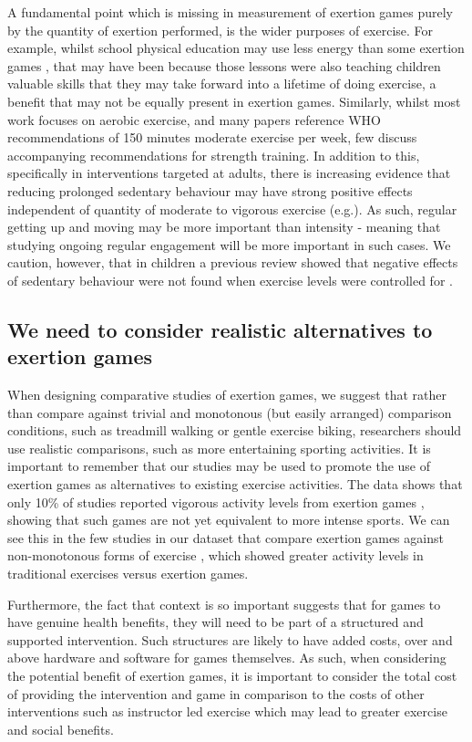 A fundamental point which is missing in measurement of exertion games purely by the quantity of exertion performed, is the wider purposes of exercise. For example, whilst school physical education may use less energy than some exertion games \cite{Gao2015AExergaming}, that may have been because those lessons were also teaching children valuable skills that they may take forward into a lifetime of doing exercise, a benefit that may not be equally present in exertion games. Similarly, whilst most work focuses on aerobic exercise, and many papers reference WHO recommendations of 150 minutes moderate exercise per week, few discuss accompanying recommendations for strength training. 
In addition to this, specifically in interventions targeted at adults, there is increasing evidence that reducing prolonged sedentary behaviour may have strong positive effects independent of quantity of moderate to vigorous exercise (e.g.\cite{healy2008objectively}). As such, regular getting up and moving may be more important than intensity - meaning that studying ongoing regular engagement will be more important in such cases. We caution, however, that in children a previous review showed that negative effects of sedentary behaviour were not found when exercise levels were controlled for \cite{cliff2016objectively}.

\subsection{We need to consider realistic alternatives to exertion games}

When designing comparative studies of exertion games, we suggest that rather than compare against trivial and monotonous (but easily arranged) comparison conditions, such as treadmill walking or gentle exercise biking, researchers should use realistic comparisons, such as more entertaining sporting activities. It is important to remember that our studies may be used to promote the use of exertion games as alternatives to existing exercise activities. The data shows that only 10\% of studies reported vigorous activity levels from exertion games \cite{Chaput2013ActiveYouth}, showing that such games are not yet equivalent to more intense sports. We can see this in the few studies in our dataset that compare exertion games against non-monotonous forms of exercise \cite{Gao2013ChildrenSDance,Rincker2017TheFitness,Sell2011EnergyActivities}, which showed greater activity levels in traditional exercises versus exertion games.

Furthermore, the fact that context is so important suggests that for games to have genuine health benefits, they will need to be part of a structured and supported intervention. Such structures are likely to have added costs, over and above hardware and software for games themselves. As such, when considering the potential benefit of exertion games, it is important to consider the total cost of providing the intervention and game in comparison to the costs of other interventions such as instructor led exercise which may lead to greater exercise and social benefits.
